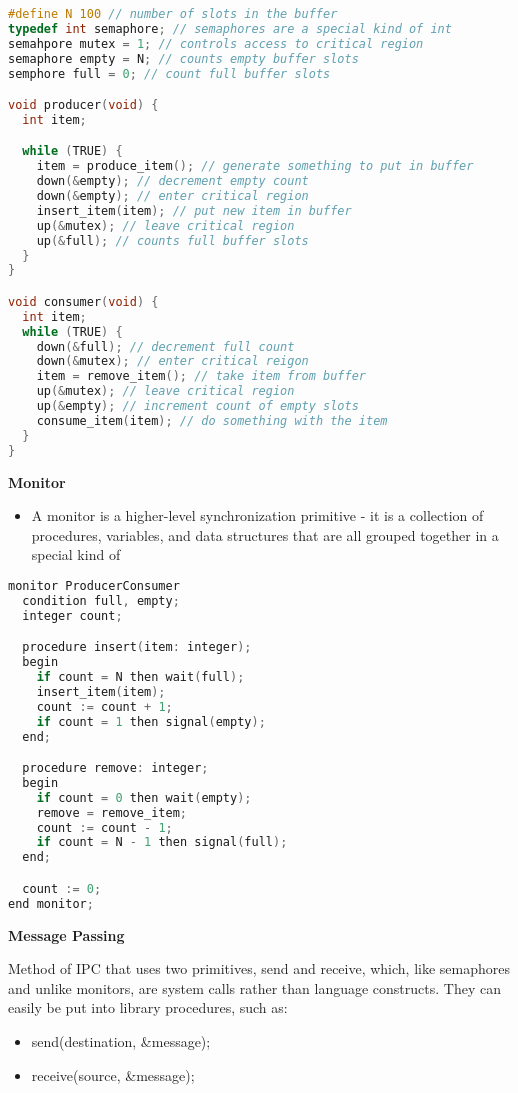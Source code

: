 \documentclass{article}
\begin{document}
\begin{lstlisting}[language=C]
#define N 100 // number of slots in the buffer
typedef int semaphore; // semaphores are a special kind of int 
semahpore mutex = 1; // controls access to critical region
semaphore empty = N; // counts empty buffer slots
semphore full = 0; // count full buffer slots

void producer(void) {
  int item;

  while (TRUE) {
    item = produce_item(); // generate something to put in buffer
    down(&empty); // decrement empty count
    down(&empty); // enter critical region
    insert_item(item); // put new item in buffer
    up(&mutex); // leave critical region
    up(&full); // counts full buffer slots
  }
}

void consumer(void) {
  int item;
  while (TRUE) {
    down(&full); // decrement full count
    down(&mutex); // enter critical reigon
    item = remove_item(); // take item from buffer
    up(&mutex); // leave critical region
    up(&empty); // increment count of empty slots
    consume_item(item); // do something with the item
  }
}
\end{lstlisting}

\textbf{Monitor}

\begin{itemize}
  \item A monitor is a higher-level synchronization primitive - it is a collection of procedures, variables, and data
    structures that are all grouped together in a special kind of 
\end{itemize}

\begin{lstlisting}[language=C]
monitor ProducerConsumer
  condition full, empty;
  integer count;

  procedure insert(item: integer);
  begin
    if count = N then wait(full);
    insert_item(item);
    count := count + 1;
    if count = 1 then signal(empty);
  end;

  procedure remove: integer;
  begin
    if count = 0 then wait(empty);
    remove = remove_item;
    count := count - 1;
    if count = N - 1 then signal(full);
  end;

  count := 0;
end monitor;
\end{lstlisting}

\textbf{Message Passing}

Method of IPC that uses two primitives, send and receive, which, like semaphores and unlike monitors, are system calls
rather than language constructs.
They can easily be put into library procedures, such as:
\begin{itemize}
  \item send(destination, \&message);
  \item receive(source, \&message);
\end{itemize}
\end{document}
